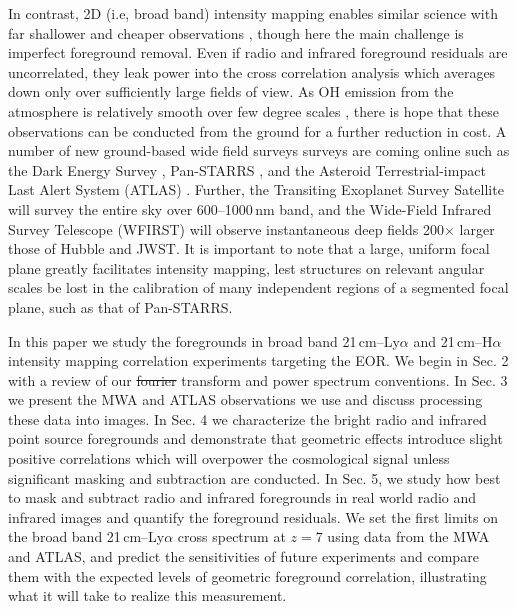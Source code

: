 \documentclass[numberedappendix]{emulateapj}
\providecommand{\DIFadd}[1]{{\protect\color{blue}\uwave{#1}}} %
\providecommand{\DIFdel}[1]{{\protect\color{red}\sout{#1}}}                      %
\providecommand{\DIFaddbegin}{} %
\providecommand{\DIFaddend}{} %
\providecommand{\DIFdelbegin}{} %
\providecommand{\DIFdelend}{} %
\begin{document}
In contrast, 2D (i.e, broad band) intensity mapping enables similar science with far shallower and cheaper observations \citep{StarsAndReionization,mao14}, though here the main challenge is imperfect foreground removal. Even if radio and infrared foreground residuals are uncorrelated, they leak power into the cross correlation analysis which averages down only over sufficiently large fields of view. As OH emission from the atmosphere is relatively smooth over few degree scales \citep{high10}, there is hope that these observations can be conducted from the ground for a further reduction in cost. A number of new ground-based wide field surveys surveys are coming online such as the Dark Energy Survey \citep{des16}, Pan-STARRS \citep{tonry12}, and the Asteroid Terrestrial-impact Last Alert System (ATLAS) \citep{tonry11}. Further, the Transiting Exoplanet Survey Satellite \citep{ricker14} will survey the entire sky over 600--1000\,nm band, and the Wide-Field Infrared Survey Telescope (WFIRST) \citep{Spergel2013} will observe instantaneous deep fields 200$\times$ larger those of Hubble and JWST. It is important to note that a large, uniform focal plane greatly facilitates intensity mapping, lest structures on relevant angular scales be lost in the calibration of many independent regions of a segmented focal plane, such as that of Pan-STARRS. 

In this paper we study the foregrounds in broad band 21\,cm--Ly$\alpha$ and 21\,cm--H$\alpha$ intensity mapping correlation experiments targeting the EOR. We begin in Sec. 2 with a review of our \DIFdelbegin \DIFdel{fourier }\DIFdelend \DIFaddbegin \DIFadd{Fourier }\DIFaddend transform and power spectrum conventions.
  In Sec. 3 we present the MWA and ATLAS observations we use and discuss processing these data into images. 
   In Sec. 4 we characterize the bright radio and infrared point source foregrounds and 
   demonstrate that geometric effects introduce slight positive correlations which will overpower the cosmological signal
   unless significant masking and subtraction are conducted. 
   In Sec. 5, we study how best to mask and subtract radio and infrared foregrounds in real world radio and infrared images and 
   quantify the foreground residuals. We set the first limits 
   on the broad band 21\,cm--Ly$\alpha$ \DIFaddbegin \DIFadd{foreground }\DIFaddend cross spectrum at $z=7$ using data from the MWA
     and ATLAS, and predict the sensitivities of future experiments and compare them with the expected levels of geometric foreground correlation, 
     illustrating what it will take to realize this measurement.
\end{document}
